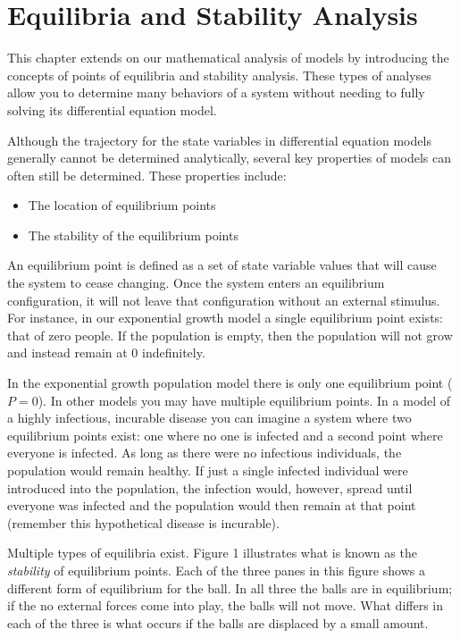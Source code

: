 \documentclass[]{memoir}
\begin{document}
\chapter{Equilibria and Stability Analysis}

This chapter extends on our mathematical analysis of models by
introducing the concepts of points of equilibria and stability analysis.
These types of analyses allow you to determine many behaviors of a
system without needing to fully solving its differential equation model.

Although the trajectory for the state variables in differential equation
models generally cannot be determined analytically, several key
properties of models can often still be determined. These properties
include:

\begin{itemize}
\itemsep1pt\parskip0pt
\item
  The location of equilibrium points
\item
  The stability of the equilibrium points
\end{itemize}

An equilibrium point is defined as a set of state variable values that
will cause the system to cease changing. Once the system enters an
equilibrium configuration, it will not leave that configuration without
an external stimulus. For instance, in our exponential growth model a
single equilibrium point exists: that of zero people. If the population
is empty, then the population will not grow and instead remain at 0
indefinitely.

In the exponential growth population model there is only one equilibrium
point ($P=0$). In other models you may have multiple equilibrium points.
In a model of a highly infectious, incurable disease you can imagine a
system where two equilibrium points exist: one where no one is infected
and a second point where everyone is infected. As long as there were no
infectious individuals, the population would remain healthy. If just a
single infected individual were introduced into the population, the
infection would, however, spread until everyone was infected and the
population would then remain at that point (remember this hypothetical
disease is incurable).

Multiple types of equilibria exist. Figure 1 illustrates what is known
as the \emph{stability} of equilibrium points. Each of the three panes
in this figure shows a different form of equilibrium for the ball. In
all three the balls are in equilibrium; if the no external forces come
into play, the balls will not move. What differs in each of the three is
what occurs if the balls are displaced by a small amount.
\end{document}
